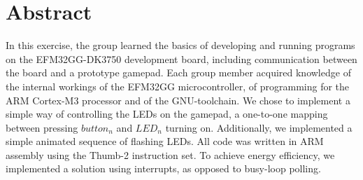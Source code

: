\chapter{Abstract}
In this exercise, the group learned the basics of developing and running programs on the EFM32GG-DK3750 development board, including communication between the board and a prototype gamepad. Each group member acquired knowledge of the internal workings of the EFM32GG microcontroller, of programming for the ARM Cortex-M3 processor and of the GNU-toolchain.
We chose to implement a simple way of controlling the LEDs on the gamepad, a one-to-one mapping between pressing $button_n$ and $LED_n$ turning on. Additionally, we implemented a simple animated sequence of flashing LEDs. All code was written in ARM assembly using the Thumb-2 instruction set. To achieve energy efficiency, we implemented a solution using interrupts, as opposed to busy-loop polling.
